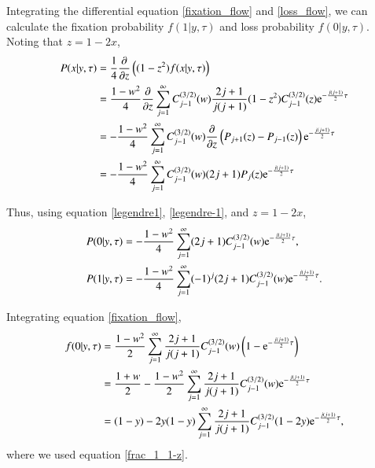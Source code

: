 \documentclass{article}
\begin{document}
Integrating the differential equation \eqref{fixation_flow} and \eqref{loss_flow}, we can calculate the fixation probability $f(1|y,\tau)$ and loss probability $f(0|y,\tau)$.
Noting that $z = 1-2x$,
\begin{align}
 P(x|y, \tau) & = \frac{1}{4} \frac{\partial {}}{\partial {z}} \left( (1-z^2) f(x|y,\tau)\right)\\
 & = \frac{1-w^2}{4} \frac{\partial {}}{\partial {z}} \sum_{j=1}^{\infty} C^{(3/2)}_{j-1} (w) \frac{2j+1}{j(j+1)} (1-z^2) C^{(3/2)}_{j-1} (z) \mathrm{e}^{-\frac{j(j+1)}{2}\tau}\\
 & = - \frac{1-w^2}{4} \sum_{j=1}^{\infty} C^{(3/2)}_{j-1} (w) \frac{\partial {}}{\partial {z}} \left( P_{j+1}(z) - P_{j-1}(z) \right) \mathrm{e}^{-\frac{j(j+1)}{2}\tau}\\
 & = - \frac{1-w^2}{4} \sum_{j=1}^{\infty} C^{(3/2)}_{j-1} (w) (2j+1)P_{j}(z) \mathrm{e}^{-\frac{j(j+1)}{2}\tau}
\end{align}

Thus, using equation \eqref{legendre1}, \eqref{legendre-1}, and $z=1-2x$,
\begin{align}
 P(0|y, \tau) & = - \frac{1-w^2}{4} \sum_{j=1}^{\infty} (2j+1) C^{(3/2)}_{j-1} (w) \mathrm{e}^{-\frac{j(j+1)}{2}\tau},\\
 P(1|y, \tau) & = - \frac{1-w^2}{4} \sum_{j=1}^{\infty} (-1)^j (2j+1) C^{(3/2)}_{j-1} (w) \mathrm{e}^{-\frac{j(j+1)}{2}\tau}.
\end{align}

Integrating equation \eqref{fixation_flow},
\begin{align}
 f(0|y,\tau) & = \frac{1-w^2}{2} \sum_{j=1}^{\infty} \frac{2j+1}{j(j+1)} C^{(3/2)}_{j-1} (w) \left(1 - \mathrm{e}^{-\frac{j(j+1)}{2}\tau} \right)\\
 & = \frac{1+w}{2} - \frac{1-w^2}{2} \sum_{j=1}^{\infty} \frac{2j+1}{j(j+1)} C^{(3/2)}_{j-1} (w) \mathrm{e}^{-\frac{j(j+1)}{2}\tau}\\
 & = (1-y) - 2y(1-y) \sum_{j=1}^{\infty} \frac{2j+1}{j(j+1)} C^{(3/2)}_{j-1} (1-2y) \mathrm{e}^{-\frac{j(j+1)}{2}\tau},
\end{align}
where we used equation \eqref{frac_1_1-z}.
\end{document}
